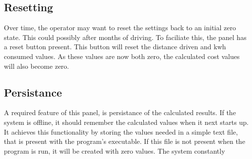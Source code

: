 \subsection{Resetting}

Over time, the operator may want to reset the settings back to an initial zero state. This could possibly after months of driving. To faciliate this, the panel has a reset button present. This button will reset the distance driven and kwh consumed values. As these values are now both zero, the calculated cost values will also become zero.

\subsection{Persistance}

A required feature of this panel, is persistance of the calculated results. If the system is offline, it should remember the calculated values when it next starts up. It achieves this functionality by storing the values needed in a simple text file, that is present with the program's executable. If this file is not present when the program is run, it will be created with zero values. The system constantly 




